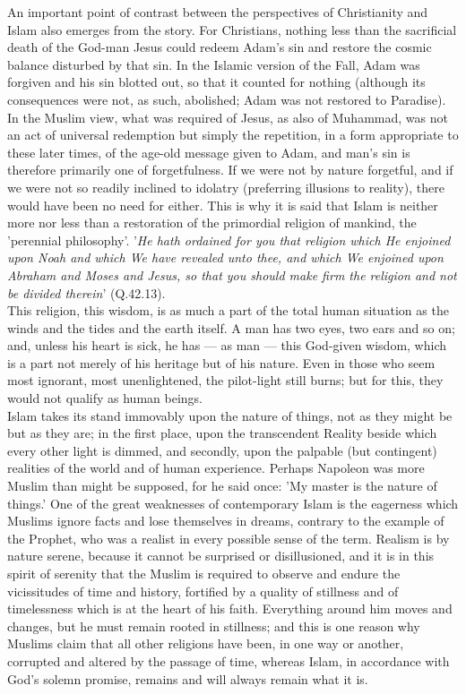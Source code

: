 \documentclass[10pt, twoside]{book}
\begin{document}
An important point of contrast between the perspectives of Christianity and Islam also emerges from 
the story. For Christians, nothing less than the sacrificial death of the God\hyp{}man Jesus could redeem 
Adam's sin and restore the cosmic balance disturbed by that sin. In the Islamic version of the Fall, 
Adam was forgiven and his sin blotted out, so that it counted for nothing (although its consequences 
were not, as such, abolished; Adam was not restored to Paradise). In the Muslim view, what was 
required of Jesus, as also of Muhammad, was not an act of universal redemption but simply the 
repetition, in a form appropriate to these later times, of the age\hyp{}old message given to Adam, and 
man's sin is therefore primarily one of forgetfulness. If we were not by nature forgetful, and if we 
were not so readily inclined to idolatry (preferring illusions to reality), there would have been no 
need for either. This is why it is said that Islam is neither more nor less than a restoration of the 
primordial religion of mankind, the 'perennial philosophy'. '\emph{He hath ordained for you that religion 
which He enjoined upon Noah and which We have revealed unto thee, and which We enjoined upon Abraham and Moses and Jesus, so that you should make firm the religion and not be divided therein}' (Q.42.13).\\

This religion, this wisdom, is as much a part of the total human situation as the winds and the tides 
and the earth itself. A man has two eyes, two ears and so on; and, unless his heart is sick, he has --- 
as man --- this God\hyp{}given wisdom, which is a part not merely of his heritage but of his nature. Even in 
those who seem most ignorant, most unenlightened, the pilot-light still burns; but for this, they 
would not qualify as human beings. \\

Islam takes its stand immovably upon the nature of things, not as they might be but as they are; in 
the first place, upon the transcendent Reality beside which every other light is dimmed, and 
secondly, upon the palpable (but contingent) realities of the world and of human experience. Perhaps 
Napoleon was more Muslim than might be supposed, for he said once: 'My master is the nature of things.' One of the great weaknesses of contemporary Islam is the eagerness which Muslims ignore facts and lose themselves in dreams, contrary to the example of the Prophet, who was a realist in every possible sense of the term. Realism is by nature serene, because it cannot be surprised or disillusioned, and it is in this spirit of serenity that the Muslim is required to observe and endure the vicissitudes of time and history, fortified by a quality of stillness and of timelessness which is at the heart of his faith. Everything around him moves and changes, but he must remain rooted in stillness; and this is one reason why Muslims claim that all other religions have been, in one way or another, corrupted and altered by the passage of time, whereas Islam, in accordance with God's solemn promise, remains and will always remain what it is. \\
\end{document}

